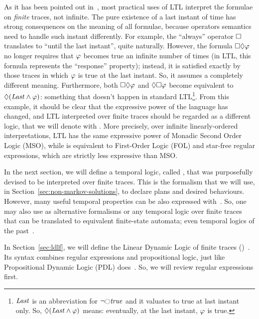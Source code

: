 As it has been pointed out in~\cite{bib:ltlf-ldlf}, most practical uses of LTL
interpret the formulae on \emph{finite} traces, not infinite. The pure
existence of a last instant of time has strong consequences on the meaning of
all formulae, because operators semantics need to handle such instant
differently.  For example, the ``always'' operator $\square$ translates to
``until the last instant'', quite naturally. However, the formula
$\square\lozenge \varphi$ no longer requires that $\varphi$ becomes true
an infinite number of times (in LTL, this formula represents the ``response''
property); instead, it is satisfied exactly by those traces in which
$\varphi$ is true at the last instant. So, it assumes a completely different
meaning.  Furthermore, both $\square\lozenge \varphi$ and
$\lozenge\square \varphi$ become equivalent to $\lozenge (\text{\textit{Last}}
\land \varphi)$: something that doesn't happen in standard LTL\footnote{
	$\text{\textit{Last}}$ is an abbreviation for $\lnot \lnext \true$ and it valuates
	to true at last instant only. So, $\lozenge (\text{\textit{Last}} \land
	\varphi)$ means: eventually, at the last instant, $\varphi$ is true.}.
From this example, it should be clear that the expressive power of the
language has changed, and LTL interpreted over finite traces should be
regarded as a different logic, that we will denote with
\ltl{}.
More precisely, over infinite linearly-ordered interpretations, LTL has the
same expressive power of Monadic Second Order Logic
(MSO), while \ltl{} is
equivalent to First-Order Logic (FOL) and
star-free regular expressions, which are strictly less expressive than MSO.

In the next section, we will define a temporal logic, called \ldl{}, that was
purposefully devised to be interpreted over finite traces. This is the
formalism that we will use, in Section~\ref{sec:non-markov-solutions}, to
declare plans and desired behaviours. However, many useful temporal properties
can be also expressed with~\ltl{}. So, one may also use as alternative
formalisms \ltl{} or any temporal logic over finite traces that can be
translated to equivalent finite-state automata; even temporal logics of the
past~\cite{bib:nmrdp-logic-first}.

In Section~\ref{sec:ldlf}, we will define the Linear Dynamic Logic of finite
traces (\ldl{})~\cite{bib:ltlf-ldlf}. Its syntax combines regular expressions
and propositional logic, just like Propositional Dynamic Logic
(PDL)
does~\cite{bib:pdl}\cite{bib:pdl-stanford}. So, we will review regular
expressions first.


